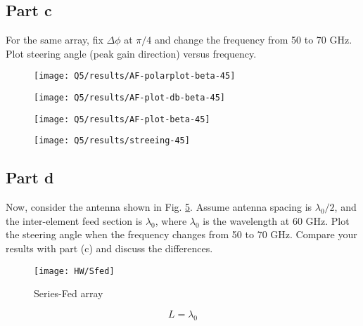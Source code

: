 \documentclass[12pt,onecolumn,a4paper]{article}
\begin{document}
\subsection{Part c}
{\color{questioncolor}
For the same array, fix $\Delta\phi$ at $\pi/4$ and change the frequency from 50 to 70 GHz.\\  Plot steering angle (peak gain direction) versus frequency.\\}


\begin{figure}[H]
	\centering
	\texttt{[image: Q5/results/AF-polarplot-beta-45]}
	\caption{}
	\label{fig:af-polarplot-beta-45}
\end{figure}

\begin{figure}[H]
	\centering
	\texttt{[image: Q5/results/AF-plot-db-beta-45]}
	\caption{}
	\label{fig:af-plot-db-beta-45}
\end{figure}

\begin{figure}[H]
	\centering
	\texttt{[image: Q5/results/AF-plot-beta-45]}
	\caption{}
	\label{fig:af-plot-beta-45}
\end{figure}



\begin{figure}[H]
	\centering
	\texttt{[image: Q5/results/streeing-45]}
	\caption{}
	\label{fig:streeing-45}
\end{figure}





\subsection{Part d}
{\color{questioncolor}
Now, consider the antenna shown in Fig. \ref{Fig3}. Assume antenna spacing is $\lambda_0/2$, and the inter-element feed section is  $\lambda_0$, where $\lambda_0$ is the wavelength at 60 GHz. Plot the steering angle when the frequency changes from 50 to 70 GHz. Compare your results with part (c) and discuss the differences.

\begin{figure}[h]
\centering
\texttt{[image: HW/Sfed]}
\caption{Series-Fed array}
\label{Fig3}
\end{figure}
}
	\begin{equation}
		L = \lambda_0
	\end{equation}
	
\end{document}
